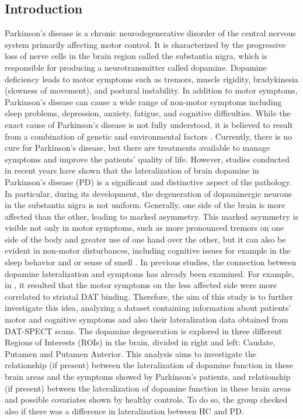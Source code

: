 \documentclass[]{article}
\begin{document}
\begin{multicols}{2}
\section{Introduction}
Parkinson's disease is a chronic neurodegenerative disorder of the central nervous system primarily affecting motor control. It is characterized by the progressive loss of nerve cells in the brain region called the substantia nigra, which is responsible for producing a neurotransmitter called dopamine. Dopamine deficiency leads to motor symptoms such as tremors, muscle rigidity, bradykinesia (slowness of movement), and postural instability. In addition to motor symptoms, Parkinson's disease can cause a wide range of non-motor symptoms including sleep problems, depression, anxiety, fatigue, and cognitive difficulties. While the exact cause of Parkinson's disease is not fully understood, it is believed to result from a combination of genetic and environmental factors \cite{beitz_parkinsons_2014}. Currently, there is no cure for Parkinson's disease, but there are treatments available to manage symptoms and improve the patients’ quality of life.  However, studies conducted in recent years have shown that the lateralization of brain dopamine in Parkinson's disease (PD) is a significant and distinctive aspect of the pathology. In particular, during its development, the degeneration of dopaminergic neurons in the substantia nigra is not uniform. Generally, one side of the brain is more affected than the other, leading to marked asymmetry. This marked asymmetry is visible not only in motor symptoms, such as more pronounced tremors on one side of the body and greater use of one hand over the other, but it can also be evident in non-motor disturbances, including cognitive issues for example in the sleep behavior and or sense of smell \cite{riederer_lateralisation_2018}. 
\newline
In previous studies, the connection between dopamine lateralization and symptoms has already been examined. For example, in \cite{pirker_correlation_2003}, it resulted that the motor symptoms on the less affected side were more correlated to striatal DAT binding.
\newline
Therefore, the aim of this study is to further investigate this idea, analyzing a dataset containing information about patients' motor and cognitive symptoms and also their lateralization data obtained from DAT-SPECT scans. The dopamine degeneration is explored in three different Regions of Interests (ROIs) in the brain, divided in right and left: Caudate, Putamen and Putamen Anterior. This analysis aims to investigate the relationship (if present) between the lateralization of dopamine function in these brain areas and the symptoms showed by Parkinson's patients, and relationship (if present) between the lateralization of dopamine function in these brain areas and possible covariates shown by healthy controls. To do so, the group checked also if there was a difference in lateralization between HC and PD. 

\end{multicols}
\end{document}
